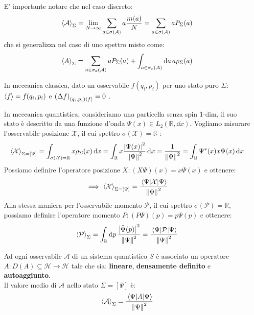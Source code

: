 E' importante notare che nel caso discreto: \[
    \expval{\mathcal{A}}_\Sigma = \lim_{N\to \infty} \sum_{a \in \sigma(\mathcal{A})} a \frac{m(a)}{N} = \sum_{a \in \sigma(\mathcal{A})} a P_\Sigma(a)
\]
che si generalizza nel caso di uno spettro misto come:
\[
    \expval{A}_\Sigma = \sum_{a \in \sigma_d(\mathcal{A})} a P_\Sigma(a) + \int_{a \in \sigma_c(\mathcal{A}) } \dd{a} a \rho_\Sigma(a)
\]

\begin{example}
    In meccanica classica, dato un osservabile \(f(q_i,p_i)\) per uno stato puro \(\Sigma\): 
    \(\expval{f}= f(q_i, p_i)\) e \(\left( \Delta f \right)_{(q_i,p_i) \expval{f}}=0\) .
\end{example}

\begin{example}
    In meccanica quantistica, consideriamo una particella senza spin 1-dim, il suo stato è descritto da una funzione d'onda \(\Psi(x) \in L_2(\mathbb{R}, \dd{x})\).
    Vogliamo misurare l'osservabile posizione \(\mathcal{X}\), il cui spettro \(\sigma(\mathcal{X}) = \mathbb{R}\) :
    \[
        \expval{\mathcal{X}}_{\Sigma= [\Psi]} = \int_{\sigma(\mathcal{X})= \mathbb{R}} x\rho_\Sigma(x) \dd{x} = \int_{\mathbb{R}} x \frac{\abs{\Psi(x)}^2}{\norm{\Psi}^2} \dd{x}= 
        \frac{1}{\norm{\Psi}^2}= \int_{\mathbb{R}} \Psi^*(x) x \Psi(x) \dd{x}
    \]
    Possiamo definire l'operatore posizione \(X: (X\Psi)(x)= x\Psi(x)\) e ottenere:
    \begin{equation}
        \implies \expval{\mathcal{X}}_{\Sigma= [\Psi]} = \frac{\expval{\mathcal{X}}{\Psi}}{\norm{\Psi}^2}
    \end{equation}
    Alla stessa maniera per l'osservabile momento \(\mathcal{P}\), il cui spettro \(\sigma(\mathcal{P})= \mathbb{R}\),
    possiamo definire l'operatore momento \(P: (P\Psi)(p)= p\Psi(p)\) e ottenere:
    \begin{equation}
        \expval{\mathcal{P}}_{\Sigma} = \int_{\mathbb{R}} \dd{p} \frac{\abs{\tilde{\Psi}(p)}^2}{\norm{\Psi}^2}= \frac{\expval{\mathcal{P}}{\Psi}}{\norm{\Psi}^2}
    \end{equation}

\end{example}

\begin{postulato2}
    Ad ogni osservabile \(\mathcal{A}\) di un sistema quantistico \(S\) è associato un operatore \(A: D(A) \subseteq \mathcal{H} \to \mathcal{H}\) tale che sia:
    \textbf{lineare}, \textbf{densamente definito} e \textbf{autoaggiunto}. \\
    Il valore medio di \(\mathcal{A}\) nello stato \(\Sigma = [\Psi]\) è:
    \begin{equation}
        \expval{\mathcal{A}}_\Sigma = \frac{\expval{A}{\Psi}}{\norm{\Psi}^2}
    \end{equation}
\end{postulato2}




